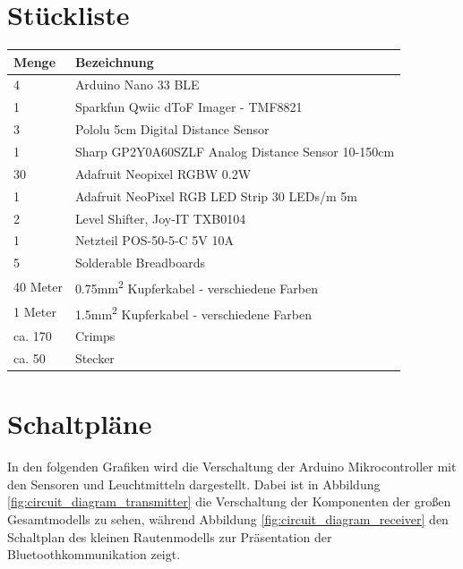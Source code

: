 \section{Stückliste}
    \begin{table}[H]
        \centering
        \begin{tabularx}{\textwidth}{ | l | X | }\hline
            \textbf{Menge} & \textbf{Bezeichnung} \\\hline
            4              & Arduino Nano 33 BLE \\\hline
            1              & Sparkfun Qwiic dToF Imager - TMF8821 \\\hline
            3              & Pololu 5cm Digital Distance Sensor \\\hline
            1              & Sharp GP2Y0A60SZLF Analog Distance Sensor 10-150cm \\\hline
            30             & Adafruit Neopixel RGBW 0.2W \\\hline            1              & Adafruit NeoPixel RGB LED Strip 30 LEDs/m 5m \\\hline
            2              & Level Shifter, Joy-IT TXB0104 \\\hline
            1              & Netzteil POS-50-5-C 5V 10A \\\hline
            5              & Solderable Breadboards \\\hline
            40 Meter       & 0.75mm\textsuperscript{2} Kupferkabel - verschiedene Farben \\\hline
            1 Meter        & 1.5mm\textsuperscript{2} Kupferkabel - verschiedene Farben \\\hline
            ca. 170        & Crimps \\\hline
            ca. 50         & Stecker \\\hline
        \end{tabularx}
    \end{table}

\section{Schaltpläne}
    In den folgenden Grafiken wird die Verschaltung der Arduino Mikrocontroller mit den Sensoren und Leuchtmitteln dargestellt. Dabei ist in Abbildung \ref{fig:circuit_diagram_transmitter} die Verschaltung der Komponenten der großen Gesamtmodells zu sehen, während Abbildung \ref{fig:circuit_diagram_receiver} den Schaltplan des kleinen Rautenmodells zur Präsentation der Bluetoothkommunikation zeigt.

